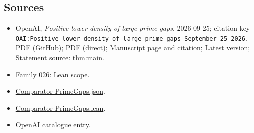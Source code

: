 \documentclass[11pt]{article}
\begin{document}
\subsection{Sources}
\begin{itemize}
\item OpenAI, \emph{Positive lower density of large prime gaps}, 2026-09-25; citation key \texttt{OAI:Positive-lower-density-of-large-prime-gaps-September-25-2026}. \href{https://github.com/openai/math/blob/adc7f1241b42e322a6451854ab7e4b4c146bf78a/preprints/Positive-lower-density-of-large-prime-gaps-September-25-2026/main.pdf}{PDF (GitHub)}; \href{https://github.com/openai/math/raw/adc7f1241b42e322a6451854ab7e4b4c146bf78a/preprints/Positive-lower-density-of-large-prime-gaps-September-25-2026/main.pdf}{PDF (direct)}; \href{https://github.com/openai/math/blob/adc7f1241b42e322a6451854ab7e4b4c146bf78a/preprints/Positive-lower-density-of-large-prime-gaps-September-25-2026/README.md}{Manuscript page and citation}; \href{https://github.com/openai/math/blob/main/preprints/Positive-lower-density-of-large-prime-gaps-September-25-2026/main.pdf}{Latest version}; Statement source: \href{https://github.com/openai/math/blob/adc7f1241b42e322a6451854ab7e4b4c146bf78a/preprints/Positive-lower-density-of-large-prime-gaps-September-25-2026/build/sections/01-introduction.tex\#L22}{thm:main}.
\item Family 026: \href{https://github.com/openai/math/blob/adc7f1241b42e322a6451854ab7e4b4c146bf78a/lean/docs/026.md}{Lean scope}.
\item \href{https://github.com/openai/math/blob/adc7f1241b42e322a6451854ab7e4b4c146bf78a/lean/ComparatorChallenges/PrimeGaps.json}{Comparator PrimeGaps.json}.
\item \href{https://github.com/openai/math/blob/adc7f1241b42e322a6451854ab7e4b4c146bf78a/lean/ComparatorChallenges/PrimeGaps.lean}{Comparator PrimeGaps.lean}.
\item \href{https://github.com/openai/math/blob/adc7f1241b42e322a6451854ab7e4b4c146bf78a/CONTENTS.md}{OpenAI catalogue entry}.
\end{itemize}
\end{document}
